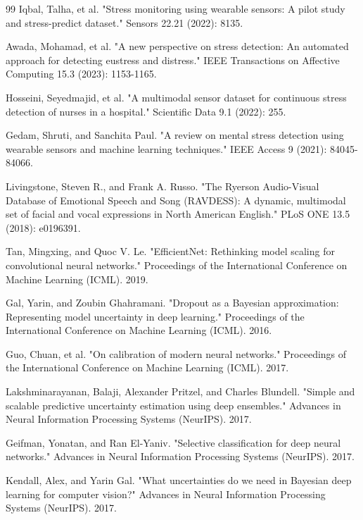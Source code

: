 \documentclass[conference]{IEEEtran}
\begin{document}
\begin{thebibliography}{99}
Iqbal, Talha, et al. "Stress monitoring using wearable sensors: A pilot study and stress-predict dataset." Sensors 22.21 (2022): 8135.

Awada, Mohamad, et al. "A new perspective on stress detection: An automated approach for detecting eustress and distress." IEEE Transactions on Affective Computing 15.3 (2023): 1153-1165.

Hosseini, Seyedmajid, et al. "A multimodal sensor dataset for continuous stress detection of nurses in a hospital." Scientific Data 9.1 (2022): 255.

Gedam, Shruti, and Sanchita Paul. "A review on mental stress detection using wearable sensors and machine learning techniques." IEEE Access 9 (2021): 84045-84066.

Livingstone, Steven R., and Frank A. Russo. "The Ryerson Audio-Visual Database of Emotional Speech and Song (RAVDESS): A dynamic, multimodal set of facial and vocal expressions in North American English." PLoS ONE 13.5 (2018): e0196391.

Tan, Mingxing, and Quoc V. Le. "EfficientNet: Rethinking model scaling for convolutional neural networks." Proceedings of the International Conference on Machine Learning (ICML). 2019.

Gal, Yarin, and Zoubin Ghahramani. "Dropout as a Bayesian approximation: Representing model uncertainty in deep learning." Proceedings of the International Conference on Machine Learning (ICML). 2016.

Guo, Chuan, et al. "On calibration of modern neural networks." Proceedings of the International Conference on Machine Learning (ICML). 2017.

Lakshminarayanan, Balaji, Alexander Pritzel, and Charles Blundell. "Simple and scalable predictive uncertainty estimation using deep ensembles." Advances in Neural Information Processing Systems (NeurIPS). 2017.

Geifman, Yonatan, and Ran El-Yaniv. "Selective classification for deep neural networks." Advances in Neural Information Processing Systems (NeurIPS). 2017.

Kendall, Alex, and Yarin Gal. "What uncertainties do we need in Bayesian deep learning for computer vision?" Advances in Neural Information Processing Systems (NeurIPS). 2017.


\end{thebibliography}
\end{document}

